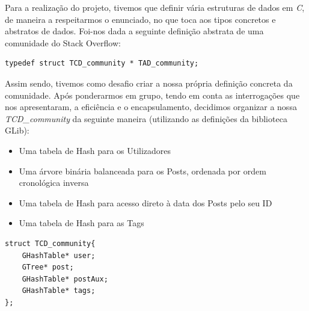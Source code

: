 \documentclass[a4paper, 11pt, oneside]{article}
\begin{document}
Para a realização do projeto, tivemos que definir vária estruturas de dados em \textit{C}, de maneira a respeitarmos o enunciado, no que toca aos tipos concretos e abstratos de dados. Foi-nos dada a seguinte definição abstrata de uma comunidade do Stack Overflow:

\begin{lstlisting}[caption=Definição da TAD\_community]
typedef struct TCD_community * TAD_community;
\end{lstlisting}

Assim sendo, tivemos como desafio criar a nossa própria definição concreta da comunidade. Após ponderarmos em grupo, tendo em conta as interrogações que nos apresentaram, a eficiência e o encapsulamento, decidimos organizar a nossa \textit{TCD\_community} da seguinte maneira (utilizando as definições da biblioteca GLib):
\begin{itemize}
\item Uma tabela de Hash para os Utilizadores
\item Uma árvore binária balanceada para os Posts, ordenada por ordem cronológica inversa
\item Uma tabela de Hash para acesso direto à data dos Posts pelo seu ID
\item Uma tabela de Hash para as Tags
\end{itemize}
\begin{lstlisting}[caption=Definição da TCD\_community]
struct TCD_community{
	GHashTable* user;
	GTree* post;
	GHashTable* postAux;
	GHashTable* tags;	
};
\end{lstlisting}
\end{document}
